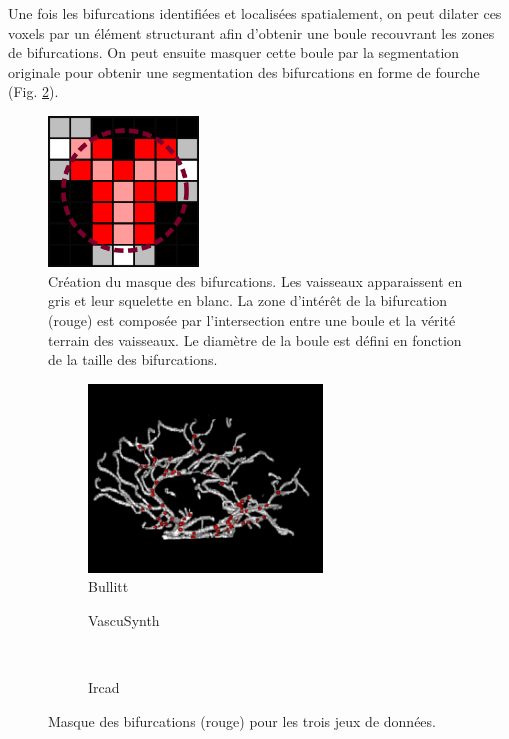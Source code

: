 Une fois les bifurcations identifiées et localisées spatialement, on peut dilater ces voxels par un élément structurant afin d'obtenir une boule recouvrant les zones de bifurcations. On peut ensuite masquer cette boule par la segmentation originale pour obtenir une segmentation des bifurcations en forme de fourche (Fig. \ref{fig:bifurcations_masks}).
\begin{figure}[!ht]
  \centering
  \includegraphics[height=4cm]{Images/bifurcation_creation.png}
  \caption{Création du masque des bifurcations. Les vaisseaux apparaissent en gris et leur squelette en blanc. La zone d'intérêt de la bifurcation (rouge) est composée par l'intersection entre une boule et la vérité terrain des vaisseaux. Le diamètre de la boule est défini en fonction de la taille des bifurcations.}
  \label{fig:barbelures}
\end{figure}
\begin{figure}[!ht]
  \captionsetup[subfigure]{justification=centering}
  \begin{subfigure}{0.45\textwidth}
    \centering
    \includegraphics[height=5cm]{Images/bifurcations_bullitt.png}
    \caption{Bullitt}
  \end{subfigure}
  \begin{subfigure}{0.45\textwidth}
    \centering
    \caption{VascuSynth}
  \end{subfigure}
  \\
  \centering
  \begin{subfigure}{0.45\textwidth}
    \centering
    \caption{Ircad}
  \end{subfigure}
  \caption{Masque des bifurcations (rouge) pour les trois jeux de données.}
  \label{fig:bifurcations_masks}
\end{figure}
